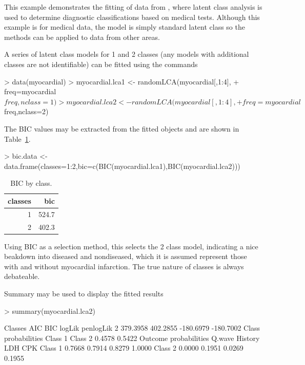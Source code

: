 This example demonstrates the fitting of data from \citet{rindskopf:1986}, where latent class analysis is used to determine diagnostic classifications based on medical tests. Although this example is for medical data, the model is simply standard latent class so the methods can be applied to data from other areas.

A series of latent class models for 1 and 2 classes (any models with additional classes are not identifiable) can be fitted using the commands
\begin{Schunk}
\begin{Sinput}
> data(myocardial)
> myocardial.lca1 <- randomLCA(myocardial[,1:4],
+ 	freq=myocardial$freq,nclass=1)
> myocardial.lca2 <- randomLCA(myocardial[,1:4],
+ 	freq=myocardial$freq,nclass=2)
\end{Sinput}
\end{Schunk}

The BIC values may be extracted from the fitted objects and are shown in Table~\ref{tab:bic1}. 

\begin{Schunk}
\begin{Sinput}
> bic.data <- data.frame(classes=1:2,bic=c(BIC(myocardial.lca1),BIC(myocardial.lca2)))
\end{Sinput}
\end{Schunk}



\begin{table}[ht]
\centering
\begin{tabular}{rr}
  \hline
classes & bic \\ 
  \hline
1 & 524.7 \\ 
  2 & 402.3 \\ 
   \hline
\end{tabular}
\caption{BIC by class.} 
\label{tab:bic1}
\end{table}


Using BIC as a selection method, this selects the 2 class model, indicating a nice beakdown into diseased and nondiseased, which it is assumed represent those with and without myocardial infarction. The true nature of classes is always debateable.

Summary may be used to display the fitted results

\begin{Schunk}
\begin{Sinput}
> summary(myocardial.lca2)
\end{Sinput}
\begin{Soutput}
  Classes      AIC      BIC    logLik penlogLik
        2 379.3958 402.2855 -180.6979 -180.7002
Class probabilities 
Class  1 Class  2 
  0.4578   0.5422 
Outcome probabilities 
         Q.wave History    LDH    CPK
Class  1 0.7668  0.7914 0.8279 1.0000
Class  2 0.0000  0.1951 0.0269 0.1955
\end{Soutput}
\end{Schunk}

